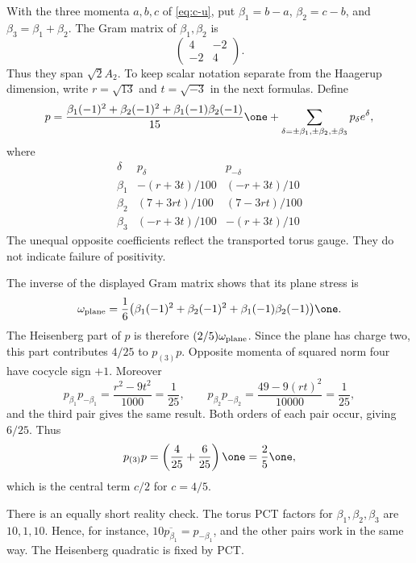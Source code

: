 With the three momenta $a,b,c$ of \eqref{eq:c-u}, put
$\beta_1=b-a$, $\beta_2=c-b$, and $\beta_3=\beta_1+\beta_2$.
The Gram matrix of $\beta_1,\beta_2$ is
\[
 \begin{pmatrix}4&-2\\-2&4\end{pmatrix}.
\]
Thus they span $\sqrt2 A_2$. To keep scalar notation separate from
the Haagerup dimension, write $r=\sqrt{13}$ and $t=\sqrt{-3}$ in
the next formulas. Define
\begin{equation}\label{eq:c-potts-vector}
 p=\frac{\beta_1(-1)^2+\beta_2(-1)^2+
                      \beta_1(-1)\beta_2(-1)}{15}\one
       +\sum_{\delta=\pm\beta_1,\pm\beta_2,\pm\beta_3}
                                    p_\delta e^\delta,
\end{equation}
where
\[
\begin{array}{c|cc}
 \delta&p_\delta&p_{-\delta}\\\hline
 \beta_1&-(r+3t)/100&(-r+3t)/10\\
 \beta_2&(7+3rt)/100&(7-3rt)/100\\
 \beta_3&(-r+3t)/100&-(r+3t)/10
\end{array}
\]
The unequal opposite coefficients reflect the transported torus gauge.
They do not indicate failure of positivity.

\begin{example}
The inverse of the displayed Gram matrix shows that its plane stress
is
\[
 \omega_{\rm plane}=\frac16
 \bigl(\beta_1(-1)^2+\beta_2(-1)^2+
                              \beta_1(-1)\beta_2(-1)\bigr)\one.
\]
The Heisenberg part of $p$ is therefore $(2/5)\omega_{\rm plane}$.
Since the plane has charge two, this part contributes $4/25$ to
$p_{(3)}p$. Opposite momenta of squared norm four have cocycle sign $+1$.
Moreover
\[
 p_{\beta_1}p_{-\beta_1}
 =\frac{r^2-9t^2}{1000}=\frac1{25},
 \qquad
 p_{\beta_2}p_{-\beta_2}
 =\frac{49-9(rt)^2}{10000}=\frac1{25},
\]
and the third pair gives the same result. Both orders of each pair
occur, giving $6/25$. Thus
\[
 p_{(3)}p=\left(\frac4{25}+\frac6{25}\right)\one
          =\frac25\one,
\]
which is the central term $c/2$ for $c=4/5$.
\end{example}

There is an equally short reality check. The torus PCT factors for
$\beta_1,\beta_2,\beta_3$ are $10,1,10$. Hence, for instance,
$10\overline{p_{\beta_1}}=p_{-\beta_1}$, and the other pairs work
in the same way. The Heisenberg quadratic is fixed by PCT.

